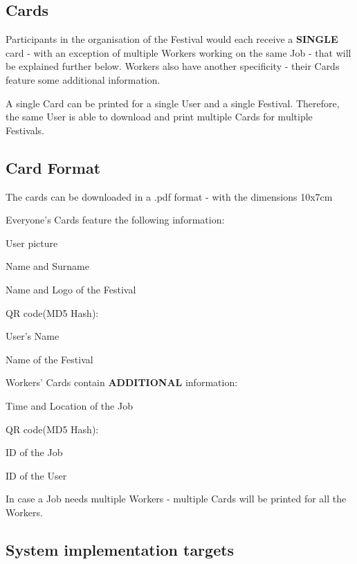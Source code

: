 		\subsection{Cards}
		 Participants in the organisation of the Festival would each receive a \textbf{SINGLE} card - with an exception of multiple Workers working on the same Job - that will be explained further below. Workers also have another specificity - their Cards feature some additional information.
		
		 A single Card can be printed for a single User and a single Festival. Therefore, the same User is able to download and print multiple Cards for multiple Festivals.
	
		\subsection{Card Format}
		 The cards can be downloaded in a .pdf format - with the dimensions 10x7cm
	
		 Everyone's Cards feature the following information:
		\begin{packed_enum}
			\item User picture
			\item Name and Surname
			\item Name and Logo of the Festival
			\item QR code(MD5 Hash):
			\item[] \begin{packed_enum}
				\item User's Name
				\item Name of the Festival
			\end{packed_enum}
		\end{packed_enum}
			
		 Workers' Cards contain \textbf{ADDITIONAL} information:
		\begin{packed_enum}
			\item Time and Location of the Job
			\item QR code(MD5 Hash):
			\item[] \begin{packed_enum}
				\item ID of the Job
				\item ID of the User
			\end{packed_enum}
		\end{packed_enum}
	
		 In case a Job needs multiple Workers - multiple Cards will be printed for all the Workers.
	\subsection{System implementation targets}
	
